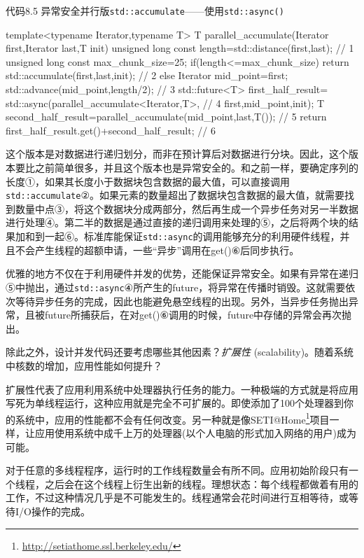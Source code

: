代码8.5 异常安全并行版\texttt{std::accumulate}——使用\texttt{std::async()}

\begin{cpp}
template<typename Iterator,typename T>
T parallel_accumulate(Iterator first,Iterator last,T init)
{
  unsigned long const length=std::distance(first,last);  // 1
  unsigned long const max_chunk_size=25;
  if(length<=max_chunk_size)
  {
    return std::accumulate(first,last,init);  // 2
  }
  else
  {
    Iterator mid_point=first;
    std::advance(mid_point,length/2);  // 3
    std::future<T> first_half_result=
      std::async(parallel_accumulate<Iterator,T>,  // 4
        first,mid_point,init);
    T second_half_result=parallel_accumulate(mid_point,last,T());  // 5
    return first_half_result.get()+second_half_result;  // 6
  }
}
\end{cpp}

这个版本是对数据进行递归划分，而非在预计算后对数据进行分块。因此，这个版本要比之前简单很多，并且这个版本也是异常安全的。和之前一样，要确定序列的长度①，如果其长度小于数据块包含数据的最大值，可以直接调用\texttt{std::accumulate}②。如果元素的数量超出了数据块包含数据的最大值，就需要找到数量中点③，将这个数据块分成两部分，然后再生成一个异步任务对另一半数据进行处理④。第二半的数据是通过直接的递归调用来处理的⑤，之后将两个块的结果加和到一起⑥。标准库能保证\texttt{std::async}的调用能够充分的利用硬件线程，并且不会产生线程的超额申请，一些“异步”调用在get()⑥后同步执行。

优雅的地方不仅在于利用硬件并发的优势，还能保证异常安全。如果有异常在递归⑤中抛出，通过\texttt{std::async}④所产生的future，将异常在传播时销毁。这就需要依次等待异步任务的完成，因此也能避免悬空线程的出现。另外，当异步任务抛出异常，且被future所捕获后，在对get()⑥调用的时候，future中存储的异常会再次抛出。

除此之外，设计并发代码还要考虑哪些其他因素？\textit{扩展性} (scalability)。随着系统中核数的增加，应用性能如何提升？


扩展性代表了应用利用系统中处理器执行任务的能力。一种极端的方式就是将应用写死为单线程运行，这种应用就是完全不可扩展的。即使添加了100个处理器到你的系统中，应用的性能都不会有任何改变。另一种就是像SETI@Home\footnote[3]{\url{http://setiathome.ssl.berkeley.edu/}}项目一样，让应用使用系统中成千上万的处理器(以个人电脑的形式加入网络的用户)成为可能。

对于任意的多线程程序，运行时的工作线程数量会有所不同。应用初始阶段只有一个线程，之后会在这个线程上衍生出新的线程。理想状态：每个线程都做着有用的工作，不过这种情况几乎是不可能发生的。线程通常会花时间进行互相等待，或等待I/O操作的完成。

